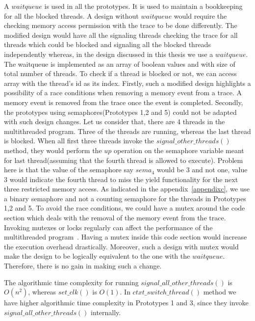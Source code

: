 A $waitqueue$ is used in all the prototypes. 
It is used to maintain a bookkeeping for all the blocked threads. 
A design without $waitqueue$ would require the checking memory access permission with the trace to be done differently. 
The modified design would have all the signaling threads checking the trace for all threads which could be blocked and signaling all the blocked threads independently whereas, in the design discussed in this thesis we use a $waitqueue$. 
The waitqueue is implemented as an array of boolean values and with size of total number of threads. 
To check if a thread is blocked or not, we can access array with the thread's id as its index. 
Firstly, such a modified design highlights a possibility of a race conditions when removing a memory event from a trace. 
A memory event is removed from the trace once the event is completed. 
Secondly, the prototypes using semaphores(Prototypes 1,2 and 5) could not be adapted with such design changes. 
Let us consider that, there are 4 threads in the multithreaded program. 
Three of the threads are running, whereas the last thread is blocked. 
When all first three threads invoke the $signal\_other\_threads()$ method, they would perform the $up$ operation on the semaphore variable meant for last thread(assuming that the fourth thread is allowed to execute). 
Problem here is that the value of the semaphore say $sema_4$ would be 3 and not one, value 3 would indicate the fourth thread to miss the yield functionality for the next three restricted memory access. 
As indicated in the appendix~\ref{appendixc}, we use a binary semaphore and not a counting semaphore for the threads in Prototypes 1,2 and 5. 
To avoid the race conditions, we could have a mutex around the code section which deals with the removal of the memory event from the trace. 
Invoking mutexes or locks regularly can affect the performance of the multithreaded program~\citep{torrellas1994false}. 
Having a mutex inside this code section would increase the execution overhead drastically. 
Moreover, such a design with mutex would make the design  to be logically equivalent to the one with the $waitqueue$. 
Therefore, there is no gain in making such a change. 

The algorithmic time complexity for running $signal\_all\_other\_threads()$ is $O(n^2)$, whereas $set\_clk()$ is $O(1)$. 
In $ctxt\_switch\_thread()$ method we have higher algorithmic time complexity in Prototypes 1 and 3, since they invoke $signal\_all\_other\_threads()$ internally.
